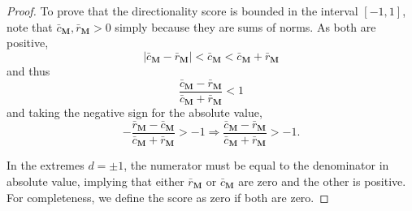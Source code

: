 \begin{proof}
%
To prove that the directionality score is bounded in the interval $[-1,1]$, note that $\bar{c}_{\mathbf{M}}, \bar{r}_{\mathbf{M}}>0$ simply because they are sums of norms. As both are positive,
\begin{equation}
    |\bar{c}_{\mathbf{M}}- \bar{r}_{\mathbf{M}}|
    < \bar{c}_{\mathbf{M}}
    < \bar{c}_{\mathbf{M}}+ \bar{r}_{\mathbf{M}}
\end{equation}
and thus 
\begin{equation}
    \dfrac{\bar{c}_{\mathbf{M}}- \bar{r}_{\mathbf{M}}}{\bar{c}_{\mathbf{M}}+ \bar{r}_{\mathbf{M}}} <1
\end{equation}
and taking the negative sign for the absolute value,
\begin{equation}
   - \dfrac{\bar{r}_{\mathbf{M}}- \bar{c}_{\mathbf{M}}}{\bar{c}_{\mathbf{M}}+ \bar{r}_{\mathbf{M}}} > -1
\Rightarrow   \dfrac{\bar{c}_{\mathbf{M}}- \bar{r}_{\mathbf{M}}}{\bar{c}_{\mathbf{M}}+ \bar{r}_{\mathbf{M}}} > -1.
\end{equation}

In the extremes $d=\pm1$, the numerator must be equal to the denominator in absolute value, implying that either $\bar{r}_{\mathbf{M}}$ or $\bar{c}_{\mathbf{M}}$ are zero and the other is positive. For completeness, we define the score as zero if both are zero.


\end{proof}
